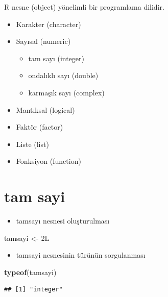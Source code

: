 \documentclass[
  oneside]{book}
\newenvironment{Shaded}{\begin{snugshade}}{\end{snugshade}}
\newcommand{\FunctionTok}[1]{\textcolor[rgb]{0.13,0.29,0.53}{\textbf{#1}}}
\newcommand{\NormalTok}[1]{#1}
\newcommand{\OtherTok}[1]{\textcolor[rgb]{0.56,0.35,0.01}{#1}}
\providecommand{\tightlist}{%
  \setlength{\itemsep}{0pt}\setlength{\parskip}{0pt}}
\begin{document}
R nesne (object) yönelimli bir programlama dilidir.

\begin{itemize}
\tightlist
\item
  Karakter (character)
\item
  Sayısal (numeric)

  \begin{itemize}
  \tightlist
  \item
    tam sayı (integer)
  \item
    ondalıklı sayı (double)
  \item
    karmaşık sayı (complex)
  \end{itemize}
\item
  Mantıksal (logical)
\item
  Faktör (factor)
\item
  Liste (list)
\item
  Fonksiyon (function)
\end{itemize}

\hypertarget{tam-sayi}{%
\section{tam sayi}\label{tam-sayi}}

\begin{itemize}
\tightlist
\item
  tamsayı nesnesi oluşturulması
\end{itemize}

\begin{Shaded}
\begin{Highlighting}[]
\NormalTok{tamsayi }\OtherTok{\textless{}{-}}\NormalTok{ 2L}
\end{Highlighting}
\end{Shaded}

\begin{itemize}
\tightlist
\item
  tamsayi nesnesinin türünün sorgulanması
\end{itemize}

\begin{Shaded}
\begin{Highlighting}[]
\FunctionTok{typeof}\NormalTok{(tamsayi)}
\end{Highlighting}
\end{Shaded}

\begin{verbatim}
## [1] "integer"
\end{verbatim}
\end{document}
